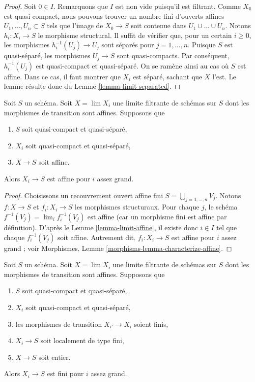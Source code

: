 \begin{proof}
Soit $0 \in I$. Remarquons que $I$ est non vide puisqu'il est filtrant.
Comme $X_0$ est quasi-compact, nous pouvons trouver un nombre fini d'ouverts
affines $U_1, \ldots, U_n \subset S$ tels que l'image de $X_0 \to S$ soit
contenue dans $U_1 \cup \ldots \cup U_n$. Notons $h_i : X_i \to S$ le
morphisme structural. Il suffit de vérifier que, pour un certain $i \geq 0$,
les morphismes $h_i^{-1}(U_j) \to U_j$ sont séparés pour
$j = 1, \ldots,  n$. Puisque $S$ est quasi-séparé, les morphismes
$U_j \to S$ sont quasi-compacts. Par conséquent, $h_i^{-1}(U_j)$ est
quasi-compact et quasi-séparé. On se ramène ainsi au cas où $S$ est affine.
Dans ce cas, il faut montrer que $X_i$ est séparé, sachant que $X$ l'est.
Le lemme résulte donc du Lemme \ref{lemma-limit-separated}.
\end{proof}

\begin{lemma}
\label{lemma-eventually-affine}
Soit $S$ un schéma. Soit $X = \lim X_i$ une limite filtrante de schémas sur
$S$ dont les morphismes de transition sont affines. Supposons que
\begin{enumerate}
\item $S$ soit quasi-compact et quasi-séparé,
\item $X_i$ soit quasi-compact et quasi-séparé,
\item $X \to S$ soit affine.
\end{enumerate}
Alors $X_i \to S$ est affine pour $i$ assez grand.
\end{lemma}

\begin{proof}
Choisissons un recouvrement ouvert affine fini
$S = \bigcup_{j = 1, \ldots, n} V_j$. Notons $f : X \to S$ et
$f_i : X_i \to S$ les morphismes structuraux. Pour chaque $j$, le schéma
$f^{-1}(V_j) = \lim_i f_i^{-1}(V_j)$ est affine (car un morphisme fini est
affine par définition). D'après le Lemme \ref{lemma-limit-affine}, il existe
donc $i \in I$ tel que chaque $f_i^{-1}(V_j)$ soit affine. Autrement dit,
$f_i : X_i \to S$ est affine pour $i$ assez grand ; voir Morphismes,
Lemme \ref{morphisms-lemma-characterize-affine}.
\end{proof}

\begin{lemma}
\label{lemma-eventually-finite}
Soit $S$ un schéma. Soit $X = \lim X_i$ une limite filtrante de schémas sur
$S$ dont les morphismes de transition sont affines. Supposons que
\begin{enumerate}
\item $S$ soit quasi-compact et quasi-séparé,
\item $X_i$ soit quasi-compact et quasi-séparé,
\item les morphismes de transition $X_{i'} \to X_i$ soient finis,
\item $X_i \to S$ soit localement de type fini,
\item $X \to S$ soit entier.
\end{enumerate}
Alors $X_i \to S$ est fini pour $i$ assez grand.
\end{lemma}

